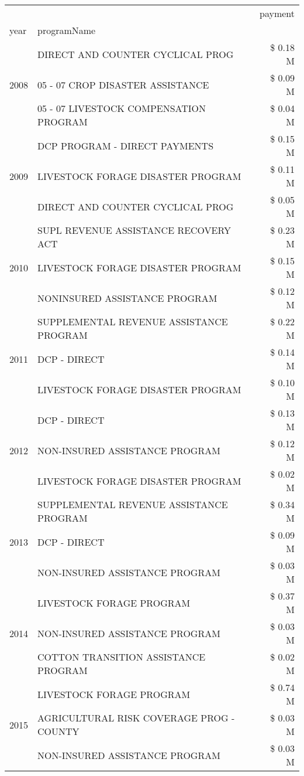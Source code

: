 \begin{tabular}{llr}
\toprule
 &  & payment \\
year & programName &  \\
\midrule
\multirow[t]{3}{*}{2008} & DIRECT AND COUNTER CYCLICAL PROG & \$ 0.18 M \\
 & 05 - 07 CROP DISASTER ASSISTANCE & \$ 0.09 M \\
 & 05 - 07 LIVESTOCK COMPENSATION PROGRAM & \$ 0.04 M \\
\cline{1-3}
\multirow[t]{3}{*}{2009} & DCP PROGRAM - DIRECT PAYMENTS & \$ 0.15 M \\
 & LIVESTOCK FORAGE DISASTER  PROGRAM & \$ 0.11 M \\
 & DIRECT AND COUNTER CYCLICAL PROG & \$ 0.05 M \\
\cline{1-3}
\multirow[t]{3}{*}{2010} & SUPL REVENUE ASSISTANCE RECOVERY ACT & \$ 0.23 M \\
 & LIVESTOCK FORAGE DISASTER  PROGRAM & \$ 0.15 M \\
 & NONINSURED ASSISTANCE PROGRAM & \$ 0.12 M \\
\cline{1-3}
\multirow[t]{3}{*}{2011} & SUPPLEMENTAL REVENUE ASSISTANCE PROGRAM & \$ 0.22 M \\
 & DCP - DIRECT & \$ 0.14 M \\
 & LIVESTOCK FORAGE DISASTER PROGRAM & \$ 0.10 M \\
\cline{1-3}
\multirow[t]{3}{*}{2012} & DCP - DIRECT & \$ 0.13 M \\
 & NON-INSURED ASSISTANCE PROGRAM & \$ 0.12 M \\
 & LIVESTOCK FORAGE DISASTER PROGRAM & \$ 0.02 M \\
\cline{1-3}
\multirow[t]{3}{*}{2013} & SUPPLEMENTAL REVENUE ASSISTANCE PROGRAM & \$ 0.34 M \\
 & DCP - DIRECT & \$ 0.09 M \\
 & NON-INSURED ASSISTANCE PROGRAM & \$ 0.03 M \\
\cline{1-3}
\multirow[t]{3}{*}{2014} & LIVESTOCK FORAGE PROGRAM & \$ 0.37 M \\
 & NON-INSURED ASSISTANCE PROGRAM & \$ 0.03 M \\
 & COTTON TRANSITION ASSISTANCE PROGRAM & \$ 0.02 M \\
\cline{1-3}
\multirow[t]{3}{*}{2015} & LIVESTOCK FORAGE PROGRAM & \$ 0.74 M \\
 & AGRICULTURAL RISK COVERAGE PROG - COUNTY & \$ 0.03 M \\
 & NON-INSURED ASSISTANCE PROGRAM & \$ 0.03 M \\

\end{tabular}
